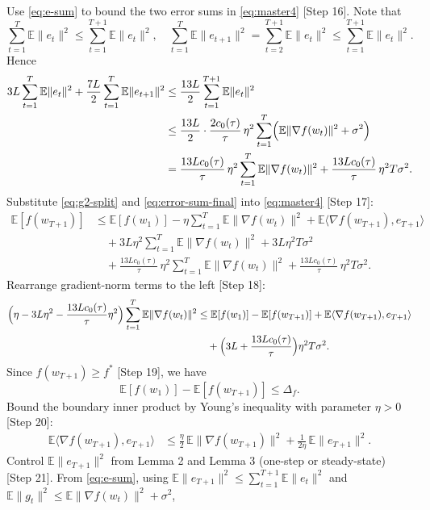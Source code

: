 \documentclass[11pt]{article}
\newcommand{\E}{\mathbb{E}}
\begin{document}
Use \eqref{eq:e-sum} to bound the two error sums in \eqref{eq:master4} [Step 16]. Note that
\[
\sum_{t=1}^{T} \E\|e_t\|^2 \le \sum_{t=1}^{T+1} \E\|e_t\|^2,\quad
\sum_{t=1}^{T} \E\|e_{t+1}\|^2 = \sum_{t=2}^{T+1} \E\|e_t\|^2 \le \sum_{t=1}^{T+1} \E\|e_t\|^2.
\]
Hence
\begin{align}
3L \sum_{t=1}^{T} \E\|e_t\|^2 + \frac{7L}{2}\sum_{t=1}^{T} \E\|e_{t+1}\|^2 
&\le \frac{13L}{2} \sum_{t=1}^{T+1} \E\|e_t\|^2 \nonumber\\
&\le \frac{13L}{2} \cdot \frac{2 c_0(\tau)}{\tau}\,\eta^2 \sum_{t=1}^T \Bigl(\E\|\nabla f(w_t)\|^2 + \sigma^2\Bigr) \nonumber\\
&= \frac{13L c_0(\tau)}{\tau}\,\eta^2 \sum_{t=1}^T \E\|\nabla f(w_t)\|^2 + \frac{13L c_0(\tau)}{\tau}\,\eta^2 T \sigma^2. \label{eq:error-sum-final}
\end{align}
Substitute \eqref{eq:g2-split} and \eqref{eq:error-sum-final} into \eqref{eq:master4} [Step 17]:
\begin{align}
\E[f(w_{T+1})]
&\le \E[f(w_1)] 
- \eta \sum_{t=1}^T \E\|\nabla f(w_t)\|^2 
+ \E\langle \nabla f(w_{T+1}), e_{T+1}\rangle \nonumber\\
&\quad + 3L\eta^2 \sum_{t=1}^T \E\|\nabla f(w_t)\|^2 + 3L\eta^2 T \sigma^2 \nonumber\\
&\quad + \frac{13L c_0(\tau)}{\tau}\,\eta^2 \sum_{t=1}^T \E\|\nabla f(w_t)\|^2 + \frac{13L c_0(\tau)}{\tau}\,\eta^2 T \sigma^2. \label{eq:master5}
\end{align}
Rearrange gradient-norm terms to the left [Step 18]:
\begin{align}
\Bigl(\eta - 3L\eta^2 - \frac{13L c_0(\tau)}{\tau}\eta^2\Bigr) \sum_{t=1}^T \E\|\nabla f(w_t)\|^2
&\le \E[f(w_1)] - \E[f(w_{T+1})] + \E\langle \nabla f(w_{T+1}), e_{T+1}\rangle \nonumber\\
&\quad + \Bigl(3L + \frac{13L c_0(\tau)}{\tau}\Bigr)\eta^2 T \sigma^2. \label{eq:pre-final}
\end{align}
Since $f(w_{T+1}) \ge f^*$ [Step 19], we have
\[
\E[f(w_1)] - \E[f(w_{T+1})] \le \Delta_f.
\]
Bound the boundary inner product by Young's inequality with parameter $\eta>0$ [Step 20]:
\begin{align}
\E\langle \nabla f(w_{T+1}), e_{T+1}\rangle
&\le \frac{\eta}{2}\,\E\|\nabla f(w_{T+1})\|^2 + \frac{1}{2\eta}\,\E\|e_{T+1}\|^2. \label{eq:boundary}
\end{align}
Control $\E\|e_{T+1}\|^2$ from Lemma 2 and Lemma 3 (one-step or steady-state) [Step 21]. From \eqref{eq:e-sum}, using $\E\|e_{T+1}\|^2 \le \sum_{t=1}^{T+1} \E\|e_t\|^2$ and $\E\|g_t\|^2 \le \E\|\nabla f(w_t)\|^2 + \sigma^2$,
\end{document}
